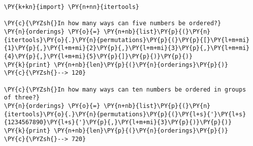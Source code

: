 \begin{Verbatim}[commandchars=\\\{\}]
\PY{k+kn}{import} \PY{n+nn}{itertools}

\PY{c}{\PYZsh{}In how many ways can five numbers be ordered?}
\PY{n}{orderings} \PY{o}{=} \PY{n+nb}{list}\PY{p}{(}\PY{n}{itertools}\PY{o}{.}\PY{n}{permutations}\PY{p}{(}\PY{p}{[}\PY{l+m+mi}{1}\PY{p}{,}\PY{l+m+mi}{2}\PY{p}{,}\PY{l+m+mi}{3}\PY{p}{,}\PY{l+m+mi}{4}\PY{p}{,}\PY{l+m+mi}{5}\PY{p}{]}\PY{p}{)}\PY{p}{)}
\PY{k}{print} \PY{n+nb}{len}\PY{p}{(}\PY{n}{orderings}\PY{p}{)}
\PY{c}{\PYZsh{}--> 120}

\PY{c}{\PYZsh{}In how many ways can ten numbers be ordered in groups of three?}
\PY{n}{orderings} \PY{o}{=} \PY{n+nb}{list}\PY{p}{(}\PY{n}{itertools}\PY{o}{.}\PY{n}{permutations}\PY{p}{(}\PY{l+s}{'}\PY{l+s}{1234567890}\PY{l+s}{'}\PY{p}{,}\PY{l+m+mi}{3}\PY{p}{)}\PY{p}{)}
\PY{k}{print} \PY{n+nb}{len}\PY{p}{(}\PY{n}{orderings}\PY{p}{)}
\PY{c}{\PYZsh{}--> 720}
\end{Verbatim}

